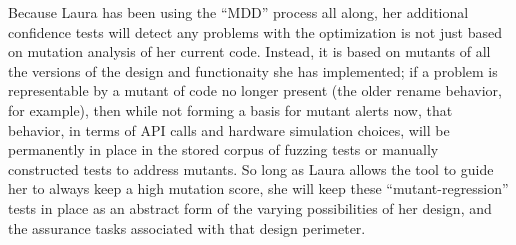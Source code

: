 Because Laura has been using the ``MDD'' process all along, her additional confidence tests will detect any problems with the optimization is not just based on mutation analysis of her current code.  Instead, it is based on mutants of all the versions of the design and functionaity she has implemented; if a problem is representable by a mutant of code no longer present (the older rename behavior, for example), then while not forming a basis for mutant alerts now, that behavior, in terms of API calls and hardware simulation choices, will be permanently in place in the stored corpus of fuzzing tests or manually constructed tests to address mutants.  So long as Laura allows the tool to guide her to always keep a high mutation score, she will keep these ``mutant-regression'' tests in place as an abstract form of the varying possibilities of her design, and the assurance tasks associated with that design perimeter.